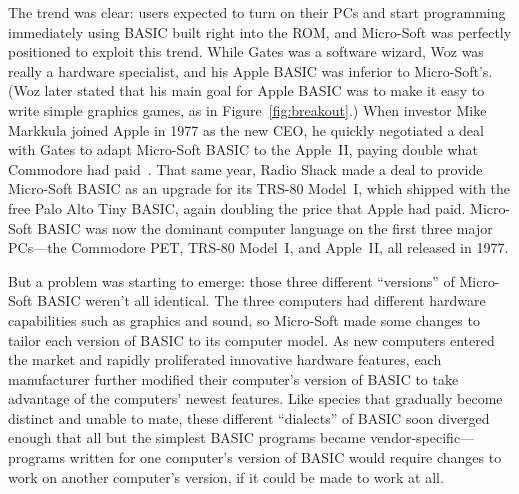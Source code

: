 

The trend was clear: users expected to turn on their PCs and start
programming immediately using BASIC built right into the ROM,
and Micro-Soft was perfectly positioned to exploit this
trend.
While Gates was a software wizard, Woz was really a hardware specialist, and
his Apple BASIC was inferior to Micro-Soft's.  (Woz later stated that
his main goal for Apple BASIC was to make it easy to write simple
graphics games, as in Figure~\ref{fig:breakout}.)
When investor Mike Markkula joined Apple in 1977
as the new CEO, he quickly negotiated a deal with Gates to adapt
Micro-Soft BASIC to the Apple~II, paying double what Commodore had
paid~\cite[p. 114]{commodore}.
That same year, Radio Shack made a deal to provide Micro-Soft
BASIC as an upgrade for its TRS-80 Model~I, which shipped with 
the free Palo Alto Tiny BASIC,
again doubling the price that Apple had paid.
Micro-Soft BASIC was now the dominant computer language on the first
three major PCs---the Commodore PET, TRS-80 Model~I, and Apple~II, all
released in 1977.


But a problem was starting to emerge: those three different
``versions'' of Micro-Soft BASIC weren't all identical.
The three computers had different hardware capabilities such as
graphics and sound, so Micro-Soft made some changes to tailor each version of
BASIC to its computer model.
As new computers entered the market and rapidly proliferated
innovative hardware features, each manufacturer further modified their
computer's version of BASIC to take advantage of the computers' newest
features.
Like species that gradually become distinct and unable to mate, these
different ``dialects'' of BASIC soon diverged enough that all but the
simplest BASIC programs became vendor-specific---programs written for
one computer's version of BASIC would require changes to work on
another computer's version, if it could be made to work at all.

